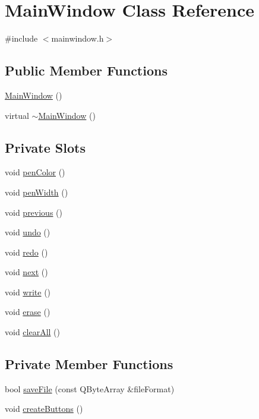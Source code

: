 \hypertarget{classMainWindow}{
\section{MainWindow Class Reference}
\label{classMainWindow}
}


{\ttfamily \#include $<$mainwindow.h$>$}\subsection*{Public Member Functions}
\begin{DoxyCompactItemize}
\item 
\hyperlink{classMainWindow_a34c4b4207b46d11a4100c9b19f0e81bb}{MainWindow} ()
\item 
virtual \hyperlink{classMainWindow_ae98d00a93bc118200eeef9f9bba1dba7}{$\sim$MainWindow} ()
\end{DoxyCompactItemize}
\subsection*{Private Slots}
\begin{DoxyCompactItemize}
\item 
void \hyperlink{classMainWindow_a747d6ddec077d48a550343583d782a8f}{penColor} ()
\item 
void \hyperlink{classMainWindow_ad856c951088a4cb92aa4cdaae399ebfb}{penWidth} ()
\item 
void \hyperlink{classMainWindow_a17ad7cbe71ea3321f5b52157a2c9a00d}{previous} ()
\item 
void \hyperlink{classMainWindow_a7ed53c4e1d2bf9321ed5df917b55d40a}{undo} ()
\item 
void \hyperlink{classMainWindow_a21b622c0f1855274d69f32421f10b251}{redo} ()
\item 
void \hyperlink{classMainWindow_aabed273350d064a3a8d73afb01848fea}{next} ()
\item 
void \hyperlink{classMainWindow_a6fd62e117414acda4fe6a93c453dfb93}{write} ()
\item 
void \hyperlink{classMainWindow_a01f536c3253476491867139572591153}{erase} ()
\item 
void \hyperlink{classMainWindow_a1c308a9a316c4fad73159288dcca4375}{clearAll} ()
\end{DoxyCompactItemize}
\subsection*{Private Member Functions}
\begin{DoxyCompactItemize}
\item 
bool \hyperlink{classMainWindow_aa115994fe40b4b2d1a746d90f887173e}{saveFile} (const QByteArray \&fileFormat)
\item 
void \hyperlink{classMainWindow_a3a5152074fdfc6e75c6f86e55fcba28d}{createButtons} ()
\end{DoxyCompactItemize}

